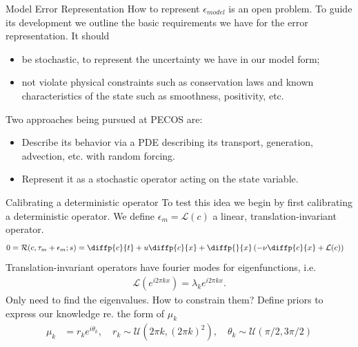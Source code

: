 \begin{frame}{ Model Error Representation }
  How to represent $\epsilon_{model}$ is an open problem.
  To guide its development we outline the basic requirements we have for the error representation.
  It should
  \begin{itemize}
    \item be stochastic, to represent the uncertainty we have in our model form;
    \item not violate physical constraints such as conservation laws and known characteristics of the state such as smoothness, positivity, etc.
  \end{itemize}
  Two approaches being pursued at PECOS are:
  \begin{itemize}
    \item Describe its behavior via a PDE describing its transport, generation, advection, etc. with random forcing.
    \item Represent it as a stochastic operator acting on the state variable.
  \end{itemize}

\end{frame}

\begin{frame}{ Calibrating a deterministic operator}
To test this idea we begin by first calibrating a deterministic operator.
  We define $\epsilon_m = \mathcal{L}(c)$ a linear, translation-invariant operator.
 \begin{align*}
  0 &= \mathcal{R}(c, \tau_m + \epsilon_m; s ) = \diffp{c}{t} + u \diffp{c}{x} +   \diffp{}{x}\left( -\nu \diffp{c}{x} + \mathcal{L}(c) \right)
  \end{align*}
Translation-invariant operators have fourier modes for eigenfunctions, i.e.
\begin{align*}
\mathcal{L}( e^{i2\pi kx} ) = \lambda_k e^{ i2\pi k x }.
\end{align*}
Only need to find the eigenvalues. How to constrain them?  Define priors to express our knowledge re. the form of $\mu_k$
\begin{align*}
	\mu_k &= r_k e^{i\theta_k}, \quad
	r_k \sim \mathcal{U}( 2 \pi k, ( 2\pi k )^{2} ), \quad \theta_k \sim \mathcal{U}( \pi/2, 3\pi/2 )
\end{align*}
\end{frame}


